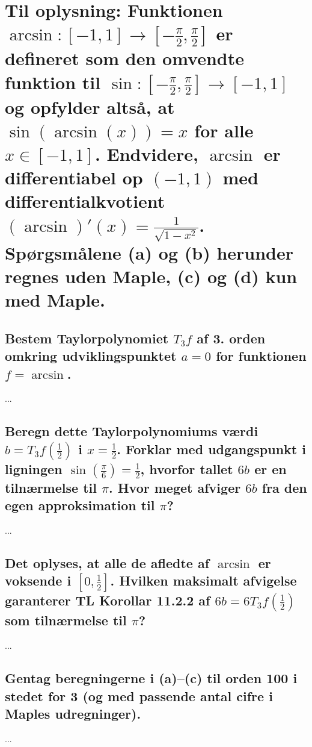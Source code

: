 \documentclass[11pt,a4paper]{article}
\newcommand{\half}{\frac{1}{2}}
\begin{document}
\section
{
    \mdseries
    Til oplysning: Funktionen $\arcsin : [-1,1] \rightarrow [-\frac{\pi}{2},
    \frac{\pi}{2}]$ er defineret som den omvendte funktion til $\sin :
    [-\frac{\pi}{2}, \frac{\pi}{2}] \rightarrow [-1,1]$ og opfylder altså, at
    $\sin(\arcsin(x)) = x$ for alle $x \in [-1,1]$. Endvidere, $\arcsin$ er
    differentiabel op $(-1,1)$ med differentialkvotient $(\arcsin)'(x) =
    \frac{1}{\sqrt{1 - x^2}}$. Spørgsmålene (a) og (b) herunder regnes uden
    Maple, (c) og (d) kun med Maple.
}

\subsection
{
    \mdseries
    Bestem Taylorpolynomiet $T_3 f$ af 3. orden omkring udviklingspunktet
    $a = 0$ for funktionen $f = \arcsin$.
}
...

\subsection
{
    \mdseries
    Beregn dette Taylorpolynomiums værdi $b = T_3 f (\half)$ i $x = \half$.
    Forklar med udgangspunkt i ligningen $\sin(\frac{\pi}{6}) = \half$,
    hvorfor tallet $6b$ er en tilnærmelse til $\pi$. Hvor meget afviger $6b$
    fra den egen approksimation til $\pi$?
}
...

\subsection
{
    \mdseries
    Det oplyses, at alle de afledte af $\arcsin$ er voksende i $[0,\half]$.
    Hvilken maksimalt afvigelse garanterer TL Korollar 11.2.2 af $6b = 6T_3
    f(\half)$ som tilnærmelse til $\pi$?
}
...

\subsection
{
    \mdseries
    Gentag beregningerne i (a)--(c) til orden 100 i stedet for 3 (og med
    passende antal cifre i Maples udregninger).
}
...
\end{document}
